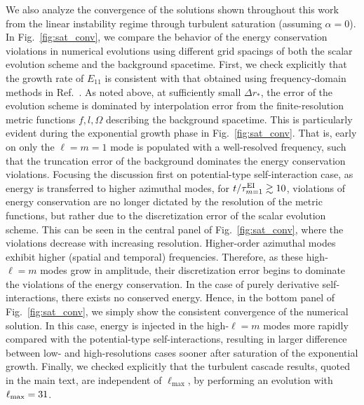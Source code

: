 \documentclass[aps,prl,notitlepage,superscriptaddress,twocolumn]{revtex4-1}
\begin{document}
We also analyze the convergence of the solutions shown throughout this work from the linear instability regime through turbulent saturation (assuming $\alpha=0$). In Fig.~\ref{fig:sat_conv}, we compare the behavior of the energy conservation violations in numerical evolutions using different grid spacings of both the scalar evolution scheme and the background spacetime. First, we check explicitly that the growth rate of $E_{11}$ is consistent with that obtained using frequency-domain methods in Ref.~\cite{Siemonsen:2025wib}. As noted above, at sufficiently small $\Delta r_*$, the error of the evolution scheme is dominated by interpolation error from the finite-resolution metric functions $f,l,\Omega$ describing the background spacetime. This is particularly evident during the exponential growth phase in Fig.~\ref{fig:sat_conv}. That is, early on only the $\ell=m=1$ mode is populated with a well-resolved frequency, such that the truncation error of the background dominates the energy conservation violations. Focusing the discussion first on potential-type self-interaction case, as energy is transferred to higher azimuthal modes, for $t/\tau^{\rm EI}_{m=1}\gtrsim 10$, violations of energy conservation are no longer dictated by the resolution of the metric functions, but rather due to the discretization error of the scalar evolution scheme. This can be seen in the central panel of Fig.~\ref{fig:sat_conv}, where the violations decrease with increasing resolution. Higher-order azimuthal modes exhibit higher (spatial and temporal) frequencies. Therefore, as these high-$\ell=m$ modes grow in amplitude, their discretization error begins to dominate the violations of the energy conservation. In the case of purely derivative self-interactions, there exists no conserved energy. Hence, in the bottom panel of Fig.~\ref{fig:sat_conv}, we simply show the consistent convergence of the numerical solution. In this case, energy is injected in the high-$\ell=m$ modes more rapidly compared with the potential-type self-interactions, resulting in larger difference between low- and high-resolutions cases sooner after saturation of the exponential growth. Finally, we checked explicitly that the turbulent cascade results, quoted in the main text, are independent of $\ell_{\max}$, by performing an evolution with $\ell_{\rm max}=31$.
\end{document}

